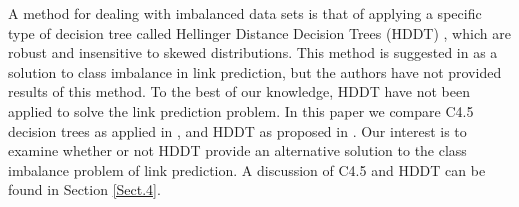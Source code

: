 \documentclass{acm_proc_article-sp}
\begin{document}
A method for dealing with imbalanced data sets is that of applying a specific type of decision tree called Hellinger Distance Decision Trees (HDDT) \cite{Cieslak2008, Cieslak2012}, which are robust and insensitive to skewed distributions. This method is suggested in \cite{Lichtenwalter:2010:NPM:1835804.1835837} as a solution to class imbalance in link prediction, but the authors have not provided results of this method. To the best of our knowledge, HDDT have not been applied to solve the link prediction problem. In this paper we compare C4.5 decision trees \cite{quinlan2014c4} as applied in \cite{Hasan06linkprediction}, and HDDT as proposed in \cite{Lichtenwalter:2010:NPM:1835804.1835837}. Our interest is to examine whether or not HDDT provide an alternative solution to the class imbalance problem of link prediction. A discussion of C4.5 and HDDT can be found in Section \ref{Sect.4}. 

\end{document}
